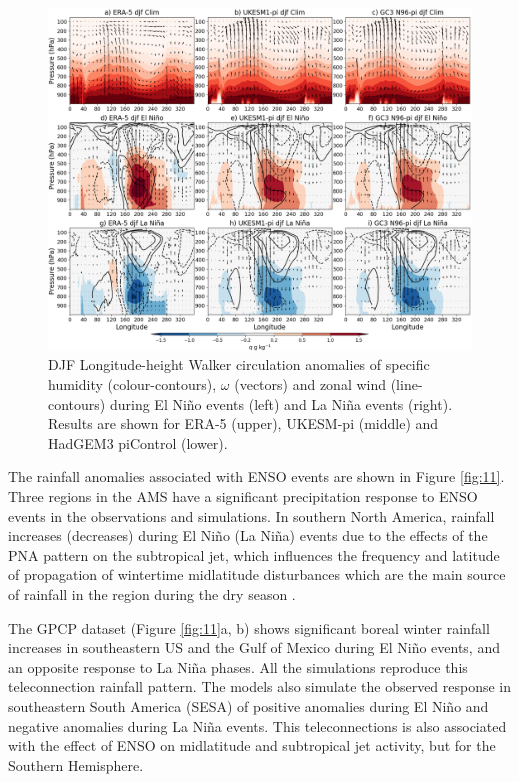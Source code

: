 \begin{figure}
\includegraphics[width=\linewidth]{figures/walkerfinal}
\caption{DJF Longitude-height Walker circulation anomalies of specific humidity (colour-contours), $\omega$ (vectors) and zonal wind (line-contours) during El Niño events (left) and La Niña events (right). Results are shown for ERA-5 (upper), UKESM-pi (middle) and HadGEM3 piControl (lower).}
\label{fig:swalker}
\end{figure}


The rainfall anomalies associated with ENSO events are shown in Figure \ref{fig:11}. Three regions in the AMS have a significant precipitation response to ENSO events in the observations and simulations.
In southern North America, rainfall increases (decreases) during El Ni\~no (La Ni\~na) events due to the effects of the PNA pattern on the subtropical jet, which influences the frequency and latitude of propagation of wintertime midlatitude disturbances which are the main source of rainfall in the region during the dry season \citep{vera2006,bayr2019}.


The GPCP dataset (Figure \ref{fig:11}a, b) shows significant boreal winter rainfall increases in southeastern US and the Gulf of Mexico during El Ni\~no events, and an opposite response to La Ni\~na phases. All the simulations reproduce this teleconnection rainfall pattern. 
The models also simulate the observed response in southeastern South America (SESA) of positive anomalies during El Ni\~no and negative anomalies during La Ni\~na events. This teleconnections is also associated with the effect of ENSO on midlatitude and subtropical jet activity, but for the Southern Hemisphere.


